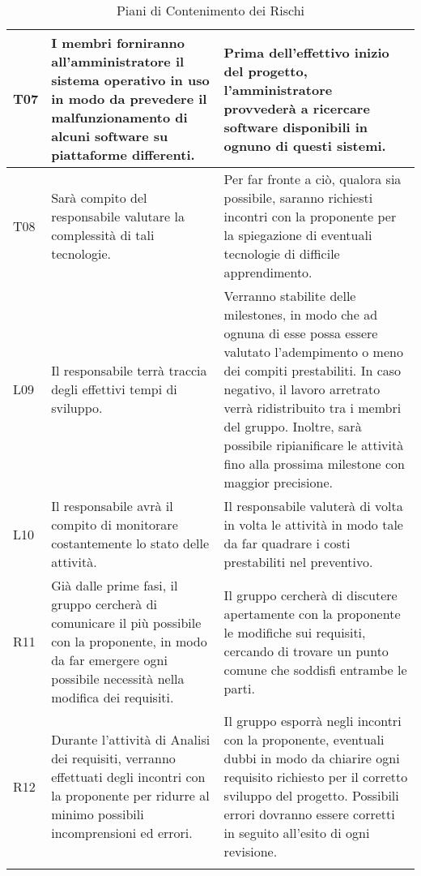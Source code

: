 \begin{longtable}{|C{.11\textwidth}|C{.40\textwidth}|C{.40\textwidth}|}
T07 & I membri forniranno all'amministratore il sistema operativo in uso in modo da prevedere il malfunzionamento di alcuni software su piattaforme differenti. & Prima dell'effettivo inizio del progetto, l'amministratore provvederà a ricercare software disponibili in ognuno di questi sistemi.\\
\hline

T08 & Sarà compito del responsabile valutare la complessità di tali tecnologie. & Per far fronte a ciò, qualora sia possibile, saranno richiesti incontri con la proponente per la spiegazione di eventuali tecnologie di difficile apprendimento.\\
\hline
L09 & Il responsabile terrà traccia degli effettivi tempi di sviluppo. & Verranno stabilite delle milestones, in modo che ad ognuna di esse possa essere valutato l'adempimento o meno dei compiti prestabiliti. In caso negativo, il lavoro arretrato verrà ridistribuito tra i membri del gruppo. Inoltre, sarà possibile ripianificare le attività fino alla prossima milestone con maggior precisione. \\
\hline
{}L10 & Il responsabile avrà il compito di monitorare costantemente lo stato delle attività. & Il responsabile valuterà di volta in volta le attività in modo tale da far quadrare i costi prestabiliti nel preventivo.\\
\hline
R11 & Già dalle prime fasi, il gruppo cercherà di comunicare il più possibile con la proponente, in modo da far emergere ogni possibile necessità nella modifica dei requisiti. & Il gruppo cercherà di discutere apertamente con la proponente le modifiche sui requisiti, cercando di trovare un punto comune che soddisfi entrambe le parti. \\
\hline
{}R12 & Durante l'attività di Analisi dei requisiti, verranno effettuati degli incontri con la proponente per ridurre al minimo possibili incomprensioni ed errori.  & Il gruppo esporrà negli incontri con la proponente, eventuali dubbi in modo da chiarire ogni requisito richiesto per il corretto sviluppo del progetto. Possibili errori dovranno essere corretti in seguito all'esito di ogni revisione.\\
\hline
\caption{Piani di Contenimento dei Rischi
\label{table:Contenimento Rischi}}
\end{longtable}
